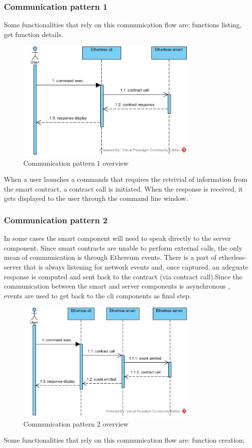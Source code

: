 \subsubsection{Communication pattern 1}
Some functionalities that rely on this communication flow are: functions listing, get function details.
\begin{figure}[h]
	\centering
	\includegraphics[width=0.8\textwidth]{res/img/pattern1.jpg}
	\caption{Communication pattern 1 overview}
\end{figure}
\noindent When a user launches a commands that requires the retrivial of information from the smart contract, a contract call is initiated. When the response is received, it gets displayed to the user through the command line window.\newline 

\subsubsection{Communication pattern 2}
In some cases the smart component will need to speak directly to the server component. Since smart contracts are unable to perform external calls, the only mean of communication is through Ethereum events. There is a part of etherless-server that is always listening for network events and, once captured, an adeguate response is computed and sent back to the contract (via contract call).\newline Since the communication between the smart and server components is asynchronous , events are used to get back to the cli components as final step.
\begin{figure}[!h]
	\centering
	\includegraphics[width=0.8\textwidth]{res/img/pattern2.jpg}
	\caption{Communication pattern 2 overview}
\end{figure}
Some functionalities that rely on this communication flow are: function creation;

